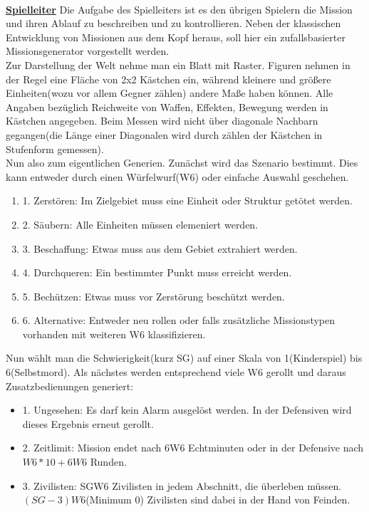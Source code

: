 \documentclass[twoside,a4paper]{minimal}
\begin{document}
\begin{multicols*}{3}
\begin{itemize}
\end{itemize}
\textbf{\uline{\\Spielleiter}}
Die Aufgabe des Spielleiters ist es den übrigen Spielern die Mission und ihren Ablauf zu beschreiben und zu kontrollieren. Neben der klassischen Entwicklung von Missionen aus dem Kopf heraus, soll hier ein zufallsbasierter Missionsgenerator vorgestellt werden.
\\Zur Darstellung der Welt nehme man ein Blatt mit Raster. Figuren nehmen in der Regel eine Fläche von 2x2 Kästchen ein, während kleinere und größere Einheiten(wozu vor allem Gegner zählen) andere Maße haben können. Alle Angaben bezüglich Reichweite von Waffen, Effekten, Bewegung werden in Kästchen angegeben. Beim Messen wird nicht über diagonale Nachbarn gegangen(die Länge einer Diagonalen wird durch zählen der Kästchen in Stufenform gemessen).
\\Nun also zum eigentlichen Generien. Zunächst wird das Szenario bestimmt. Dies kann entweder durch einen Würfelwurf(W6) oder einfache Auswahl geschehen.
\begin{enumerate}
\item 1. Zerstören: Im Zielgebiet muss eine Einheit oder Struktur getötet werden.
\item 2. Säubern: Alle Einheiten müssen elemeniert werden.
\item 3. Beschaffung: Etwas muss aus dem Gebiet extrahiert werden.
\item 4. Durchqueren: Ein bestimmter Punkt muss erreicht werden.
\item 5. Bechützen: Etwas muss vor Zerstörung beschützt werden.
\item 6. Alternative: Entweder neu rollen oder falls zusätzliche Missionstypen vorhanden mit weiteren W6 klassifizieren.
\end{enumerate}
Nun wählt man die Schwierigkeit(kurz SG) auf einer Skala von 1(Kinderspiel) bis 6(Selbstmord). Als nächstes werden entsprechend viele W6 gerollt und daraus Zusatzbedienungen generiert:
\begin{itemize}
\item 1. Ungesehen: Es darf kein Alarm ausgelöst werden. In der Defensiven wird dieses Ergebnis erneut gerollt.
\item 2. Zeitlimit: Mission endet nach 6W6 Echtminuten oder in der Defensive nach $W6*10+6W6$ Runden.
\item 3. Zivilisten: SGW6 Zivilisten in jedem Abschnitt, die überleben müssen. $(SG-3)W6$(Minimum 0) Zivilisten sind dabei in der Hand von Feinden.

\end{itemize}
\end{multicols*}
\end{document}
